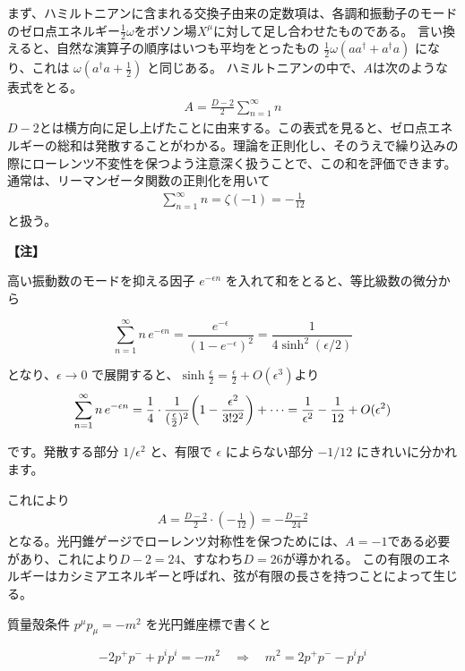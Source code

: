 \documentclass[11pt, dvipdfmx]{article}
\numberwithin{equation}{section}
\newcommand{\blankline}{\par\vspace{\baselineskip}} %
\newenvironment{note}{
    \vspace{1ex} %
    \par\footnotesize\noindent\textbf{【注】}
}{
    \par\vspace{1ex} %
}
\begin{document}
まず、ハミルトニアンに含まれる交換子由来の定数項は、各調和振動子のモードのゼロ点エネルギー$\frac{1}{2}\omega$をボソン場$X^\mu$に対して足し合わせたものである。
言い換えると、自然な演算子の順序はいつも平均をとったもの $\tfrac12\omega(aa^{\dagger} + a^\dagger a)$ になり、これは $\omega(a^\dagger a + \tfrac12)$ と同じある。
ハミルトニアンの中で、$A$は次のような表式をとる。
\begin{align}
    A=\frac{D-2}{2}\sum_{n=1}^{\infty} n
\end{align}
$D-2$とは横方向に足し上げたことに由来する。この表式を見ると、ゼロ点エネルギーの総和は発散することがわかる。理論を正則化し、そのうえで繰り込みの際にローレンツ不変性を保つよう注意深く扱うことで、この和を評価できます。通常は、リーマンゼータ関数の正則化を用いて
\begin{align}
    \sum_{n=1}^{\infty} n = \zeta(-1) = -\frac{1}{12}
\end{align}
と扱う。
\begin{note}
    高い振動数のモードを抑える因子 $e^{-\epsilon n}$ を入れて和をとると、等比級数の微分から


\[\sum_{n=1}^\infty n\,e^{-\epsilon n} = \frac{e^{-\epsilon}}{(1-e^{-\epsilon})^2} = \frac{1}{4\sinh^2(\epsilon/2)}\]

となり、$\epsilon \to 0$ で展開すると、$\sinh \frac{\epsilon}{2}=\frac{\epsilon}{2} + O(\epsilon^3)$より
\[\sum_{n=1}^\infty n\,e^{-\epsilon n} = \frac{1}{4}\cdot \frac{1}{(\frac{\epsilon}{2})^2}\qty(1-\frac{\epsilon^2}{3!2^2})+\cdots=\frac{1}{\epsilon^2} - \frac{1}{12} + O(\epsilon^2)\]

です。発散する部分 $1/\epsilon^2$ と、有限で $\epsilon$ によらない部分 $-1/12$ にきれいに分かれます。
\end{note}これにより
\begin{align}
    A = \frac{D-2}{2} \cdot \left(-\frac{1}{12}\right) = -\frac{D-2}{24}
\end{align}
となる。光円錐ゲージでローレンツ対称性を保つためには、$A=-1$である必要があり、これにより$D-2=24$、すなわち$D=26$が導かれる。
この有限のエネルギーはカシミアエネルギーと呼ばれ、弦が有限の長さを持つことによって生じる。
\blankline
\blankline
質量殻条件 $p^\mu p_\mu = -m^2$ を光円錐座標で書くと


\[-2p^+p^- + p^ip^i = -m^2 \quad\Rightarrow\quad m^2 = 2p^+p^- - p^ip^i\]
\end{document}
